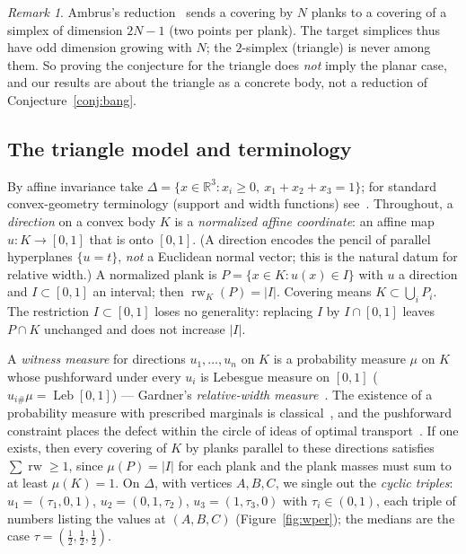 \documentclass{aims}
\numberwithin{equation}{section}
\theoremstyle{plain}
\theoremstyle{definition}
\theoremstyle{remark}
\newtheorem{remark}[theorem]{Remark}
\newcommand{\rw}{\operatorname{rw}}
\newcommand{\Leb}{\operatorname{Leb}}
\newcommand{\R}{\mathbb{R}}
\begin{document}
\begin{remark}\label{rem:ambrus}
Ambrus's reduction~\cite{Ambrus} sends a covering by $N$ planks to a covering of a
simplex of dimension $2N-1$ (two points per plank). The target simplices thus have
odd dimension growing with $N$; the $2$-simplex (triangle) is never among them. So
proving the conjecture for the triangle does \emph{not} imply the planar case, and
our results are about the triangle as a concrete body, not a reduction of
Conjecture~\ref{conj:bang}.
\end{remark}

\subsection*{The triangle model and terminology}
By affine invariance take $\Delta=\{x\in\R^3:x_i\ge0,\ x_1+x_2+x_3=1\}$; for
standard convex-geometry terminology (support and width functions)
see~\cite{Schneider14}.
Throughout, a \emph{direction} on a convex body $K$ is a \emph{normalized
affine coordinate}: an affine map $u:K\to[0,1]$ that is onto $[0,1]$. (A
direction encodes the pencil of parallel hyperplanes $\{u=t\}$, \emph{not} a
Euclidean normal vector; this is the natural datum for relative width.) A
normalized plank is $P=\{x\in K: u(x)\in I\}$ with $u$ a direction and
$I\subset[0,1]$ an interval; then $\rw_K(P)=|I|$. Covering
means $K\subset\bigcup_i P_i$. The restriction $I\subset[0,1]$ loses no
generality: replacing $I$ by $I\cap[0,1]$ leaves $P\cap K$ unchanged and does
not increase $|I|$.

A \emph{witness measure} for directions $u_1,\dots,u_n$ on $K$ is a probability
measure $\mu$ on $K$ whose pushforward under every $u_i$ is Lebesgue measure on
$[0,1]$ ($u_{i\#}\mu=\Leb[0,1]$) --- Gardner's \emph{relative-width
measure}~\cite{Gardner88}. The existence of a probability measure with
prescribed marginals is classical~\cite{Strassen65}, and the pushforward
constraint places the defect within the circle of ideas of optimal
transport~\cite{Villani09}. If one exists, then every covering of $K$ by planks
parallel to these directions satisfies $\sum\rw\ge1$, since $\mu(P)=|I|$ for
each plank and the plank masses must sum to at least $\mu(K)=1$.
On $\Delta$, with vertices $A,B,C$, we single out the \emph{cyclic triples}:
$u_1=(\tau_1,0,1)$, $u_2=(0,1,\tau_2)$, $u_3=(1,\tau_3,0)$ with
$\tau_i\in(0,1)$, each triple of numbers listing the values at $(A,B,C)$
(Figure~\ref{fig:wper}); the medians are the case
$\tau=(\tfrac12,\tfrac12,\tfrac12)$.
\end{document}
